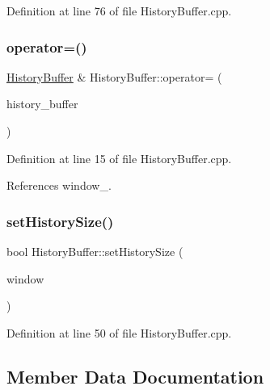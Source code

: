 Definition at line 76 of file History\+Buffer.\+cpp.

\mbox{\label{classbfl_1_1HistoryBuffer_a77a0d57c5413a374bf21d51693a81715}} 
\subsubsection{\texorpdfstring{operator=()}{operator=()}}
{\footnotesize\ttfamily \mbox{\hyperlink{classbfl_1_1HistoryBuffer}{History\+Buffer}} \& History\+Buffer\+::operator= (\begin{DoxyParamCaption}\item[{\mbox{\hyperlink{classbfl_1_1HistoryBuffer}{History\+Buffer}} \&\&}]{history\+\_\+buffer }\end{DoxyParamCaption})\hspace{0.3cm}{\ttfamily [noexcept]}}



Definition at line 15 of file History\+Buffer.\+cpp.



References window\+\_\+.

\mbox{\label{classbfl_1_1HistoryBuffer_a34bc31abe55f9d43575919a15a1f90c3}} 
\subsubsection{\texorpdfstring{set\+History\+Size()}{setHistorySize()}}
{\footnotesize\ttfamily bool History\+Buffer\+::set\+History\+Size (\begin{DoxyParamCaption}\item[{const unsigned int}]{window }\end{DoxyParamCaption})}



Definition at line 50 of file History\+Buffer.\+cpp.



\subsection{Member Data Documentation}
\mbox{\label{classbfl_1_1HistoryBuffer_a7f3992afff5140e0d3899b03bb26b9ac}} 

